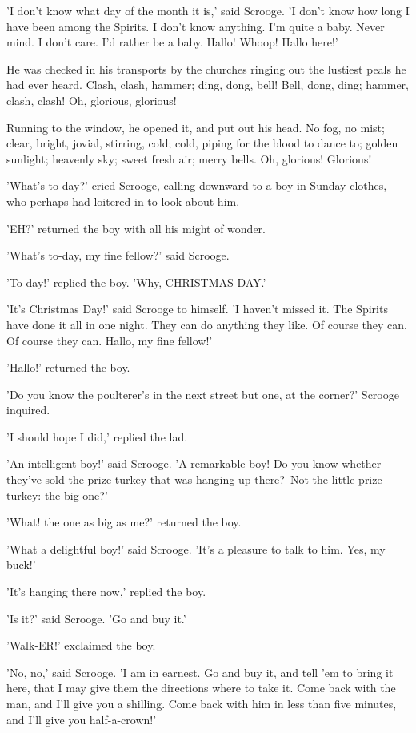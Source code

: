 'I don't know what day of the month it is,' said Scrooge. 'I don't know
how long I have been among the Spirits. I don't know anything. I'm quite
a baby. Never mind. I don't care. I'd rather be a baby. Hallo! Whoop!
Hallo here!'

He was checked in his transports by the churches ringing out the
lustiest peals he had ever heard. Clash, clash, hammer; ding, dong,
bell! Bell, dong, ding; hammer, clash, clash! Oh, glorious, glorious!

Running to the window, he opened it, and put out his head. No fog, no
mist; clear, bright, jovial, stirring, cold; cold, piping for the blood
to dance to; golden sunlight; heavenly sky; sweet fresh air; merry
bells. Oh, glorious! Glorious!

'What's to-day?' cried Scrooge, calling downward to a boy in Sunday
clothes, who perhaps had loitered in to look about him.

'EH?' returned the boy with all his might of wonder.

'What's to-day, my fine fellow?' said Scrooge.

'To-day!' replied the boy. 'Why, CHRISTMAS DAY.'

'It's Christmas Day!' said Scrooge to himself. 'I haven't missed it. The
Spirits have done it all in one night. They can do anything they like.
Of course they can. Of course they can. Hallo, my fine fellow!'

'Hallo!' returned the boy.

'Do you know the poulterer's in the next street but one, at the corner?'
Scrooge inquired.

'I should hope I did,' replied the lad.

'An intelligent boy!' said Scrooge. 'A remarkable boy! Do you know
whether they've sold the prize turkey that was hanging up there?--Not
the little prize turkey: the big one?'

'What! the one as big as me?' returned the boy.

'What a delightful boy!' said Scrooge. 'It's a pleasure to talk to him.
Yes, my buck!'

'It's hanging there now,' replied the boy.

'Is it?' said Scrooge. 'Go and buy it.'

'Walk-ER!' exclaimed the boy.

'No, no,' said Scrooge. 'I am in earnest. Go and buy it, and tell 'em to
bring it here, that I may give them the directions where to take it.
Come back with the man, and I'll give you a shilling. Come back with him
in less than five minutes, and I'll give you half-a-crown!'

